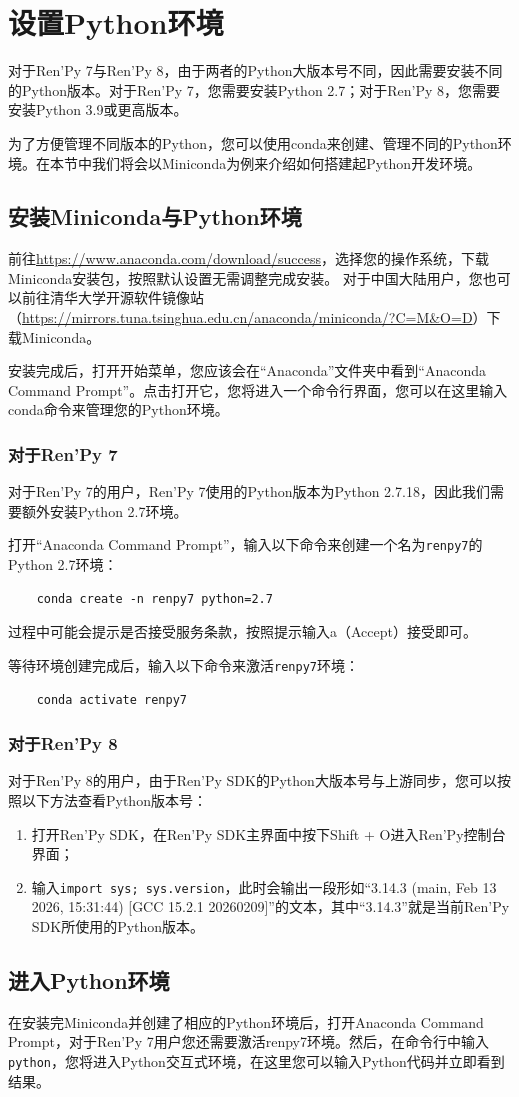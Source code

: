 \documentclass[../../Main.tex]{subfiles}
\begin{document}
\section{设置Python环境}
对于Ren'Py 7与Ren'Py 8，由于两者的Python大版本号不同，因此需要安装不同的Python版本。对于Ren'Py 7，您需要安装Python 2.7；对于Ren'Py 8，您需要安装Python 3.9或更高版本。

为了方便管理不同版本的Python，您可以使用conda来创建、管理不同的Python环境。在本节中我们将会以Miniconda为例来介绍如何搭建起Python开发环境。

\subsection{安装Miniconda与Python环境}
前往\url{https://www.anaconda.com/download/success}，选择您的操作系统，下载Miniconda安装包，按照默认设置无需调整完成安装。
对于中国大陆用户，您也可以前往清华大学开源软件镜像站（\url{https://mirrors.tuna.tsinghua.edu.cn/anaconda/miniconda/?C=M&O=D}）下载Miniconda。

安装完成后，打开开始菜单，您应该会在“Anaconda”文件夹中看到“Anaconda Command Prompt”。点击打开它，您将进入一个命令行界面，您可以在这里输入conda命令来管理您的Python环境。

\subsubsection{对于Ren'Py 7}
对于Ren'Py 7的用户，Ren'Py 7使用的Python版本为Python 2.7.18，因此我们需要额外安装Python 2.7环境。

打开“Anaconda Command Prompt”，输入以下命令来创建一个名为\verb|renpy7|的Python 2.7环境：
\begin{verbatim}
    conda create -n renpy7 python=2.7
\end{verbatim}

过程中可能会提示是否接受服务条款，按照提示输入a（Accept）接受即可。

等待环境创建完成后，输入以下命令来激活\verb|renpy7|环境：
\begin{verbatim}
    conda activate renpy7
\end{verbatim}

\subsubsection{对于Ren'Py 8}
对于Ren'Py 8的用户，由于Ren'Py SDK的Python大版本号与上游同步，您可以按照以下方法查看Python版本号：
\begin{enumerate}
    \item 打开Ren'Py SDK，在Ren'Py SDK主界面中按下Shift + O进入Ren'Py控制台界面；
    \item 输入\verb|import sys; sys.version|，此时会输出一段形如“3.14.3 (main, Feb 13 2026, 15:31:44) [GCC 15.2.1 20260209]”的文本，其中“3.14.3”就是当前Ren'Py SDK所使用的Python版本。
\end{enumerate}

\subsection{进入Python环境}
在安装完Miniconda并创建了相应的Python环境后，打开Anaconda Command Prompt，对于Ren'Py 7用户您还需要激活renpy7环境。然后，在命令行中输入\verb|python|，您将进入Python交互式环境，在这里您可以输入Python代码并立即看到结果。
\end{document}
